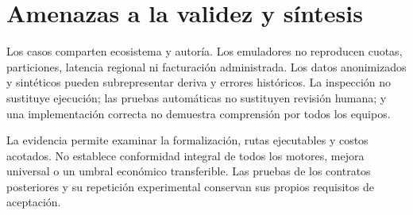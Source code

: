 \chapter{Amenazas a la validez y síntesis}

Los casos comparten ecosistema y autoría. Los emuladores no reproducen cuotas,
particiones, latencia regional ni facturación administrada. Los datos anonimizados y
sintéticos pueden subrepresentar deriva y errores históricos. La inspección no sustituye
ejecución; las pruebas automáticas no sustituyen revisión humana; y una implementación
correcta no demuestra comprensión por todos los equipos.

La evidencia permite examinar la formalización, rutas ejecutables y costos acotados.
No establece conformidad integral de todos los motores, mejora universal o un umbral
económico transferible. Las pruebas de los contratos posteriores y su repetición
experimental conservan sus propios requisitos de aceptación.
